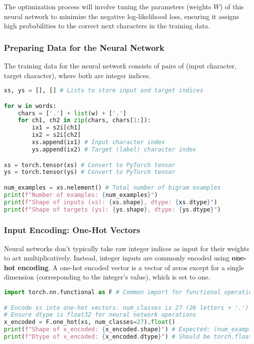 The optimization process will involve tuning the parameters (weights $W$) of this neural network to minimize the negative log-likelihood loss, ensuring it assigns high probabilities to the correct next characters in the training data.

\subsubsection{Preparing Data for the Neural Network}
The training data for the neural network consists of pairs of (input character, target character), where both are integer indices.

\begin{lstlisting}[language=Python, caption=Creating Input (xs) and Target (ys) Tensors]
xs, ys = [], [] # Lists to store input and target indices

for w in words:
    chars = ['.'] + list(w) + ['.']
    for ch1, ch2 in zip(chars, chars[1:]):
        ix1 = s2i[ch1]
        ix2 = s2i[ch2]
        xs.append(ix1) # Input character index
        ys.append(ix2) # Target (label) character index

xs = torch.tensor(xs) # Convert to PyTorch tensor
ys = torch.tensor(ys) # Convert to PyTorch tensor

num_examples = xs.nelement() # Total number of bigram examples
print(f"Number of examples: {num_examples}")
print(f"Shape of inputs (xs): {xs.shape}, dtype: {xs.dtype}")
print(f"Shape of targets (ys): {ys.shape}, dtype: {ys.dtype}")
\end{lstlisting}

\subsubsection{Input Encoding: One-Hot Vectors}
Neural networks don't typically take raw integer indices as input for their weights to act multiplicatively. Instead, integer inputs are commonly encoded using \textbf{one-hot encoding}. A one-hot encoded vector is a vector of zeros except for a single dimension (corresponding to the integer's value), which is set to one.

\begin{lstlisting}[language=Python, caption=One-Hot Encoding Inputs]
import torch.nn.functional as F # Common import for functional operations

# Encode xs into one-hot vectors. num_classes is 27 (26 letters + '.')
# Ensure dtype is float32 for neural network operations
x_encoded = F.one_hot(xs, num_classes=27).float()
print(f"Shape of x_encoded: {x_encoded.shape}") # Expected: (num_examples, 27)
print(f"Dtype of x_encoded: {x_encoded.dtype}") # Should be torch.float32
\end{lstlisting}

